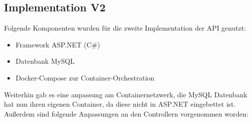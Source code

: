 \subsection{Implementation V2} \label{sec:Implementation2}
    Folgende Komponenten wurden für die zweite Implementation der \ac{API} genutzt:
    \begin{itemize}
        \item Framework ASP.NET (C\#)
        \item Datenbank MySQL
        \item Docker-Compose zur Container-Orchestration
    \end{itemize}

    Weiterhin gab es eine anpassung am Containernetzwerk, die MySQL Datenbank hat nun ihren eigenen Container, da diese nicht in ASP.NET eingebettet ist.
    Außerdem sind folgende Anpassungen an den Controllern vorgenommen worden:
